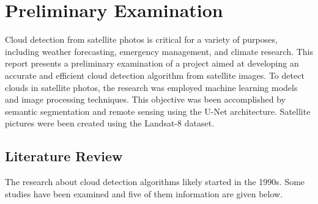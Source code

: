 \chapter{Preliminary Examination}
Cloud detection from satellite photos is critical for a variety of purposes, including weather forecasting, emergency management, and climate research. This report presents a preliminary examination of a project aimed at developing an accurate and efficient cloud detection algorithm from satellite images. To detect clouds in satellite photos, the research was employed machine learning models and image processing techniques. This objective was been accomplished by semantic segmentation and remote sensing using the U-Net architecture. Satellite pictures were been created using the Landsat-8 dataset. 

\section{Literature Review}

The research about cloud detection algorithms likely started in the 1990s. Some studies have been examined and five of them information are given below. 


